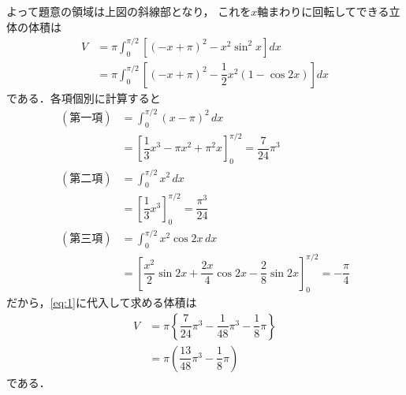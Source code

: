 \documentclass[../../main.tex]{subfiles}
\begin{document}
よって題意の領域は上図の斜線部となり，
これを$x$軸まわりに回転してできる立体の体積は
\begin{align}
  V
  & =\pi\int_0^{\pi/2}\left[(-x+\pi)^2-x^2\sin^2x\right]dx \\
  & =\pi\int_0^{\pi/2}\left[(-x+\pi)^2-\dfrac{1}{2}x^2(1-\cos 2x)\right]dx   \label{eq:1}
\end{align}
である．各項個別に計算すると
\begin{align}
  (\text{第一項})
  & = \int_0^{\pi/2}(x-\pi)^2\,dx \\
  & =\left[\dfrac{1}{3}x^3-\pi x^2+\pi^2x\right]_0^{\pi/2}=\dfrac{7}{24}\pi^3 \\
  (\text{第二項})
  & =  \int_0^{\pi/2}x^2\, dx \\
  & = \left[\dfrac{1}{3}x^3\right]_{0}^{\pi/2} = \dfrac{\pi^3}{24} \\
  (\text{第三項})
  & =  \int_0^{\pi/2}x^2\cos2x\,dx \\
  & =\left[\dfrac{x^2}{2}\sin2x+\dfrac{2x}{4}\cos2x-\dfrac{2}{8}\sin2x\right]_0^{\pi/2}=-\dfrac{\pi}{4}
\end{align}
だから，\cref{eq:1}に代入して求める体積は
\begin{align}
  V
  &=\pi\left\{\dfrac{7}{24}\pi^3-\dfrac{1}{48}\pi^3-\dfrac{1}{8}\pi\right\}\\
  &=\pi\left(\dfrac{13}{48}\pi^3-\dfrac{1}{8}\pi\right)
\end{align}
である．

\newpage
\end{document}
